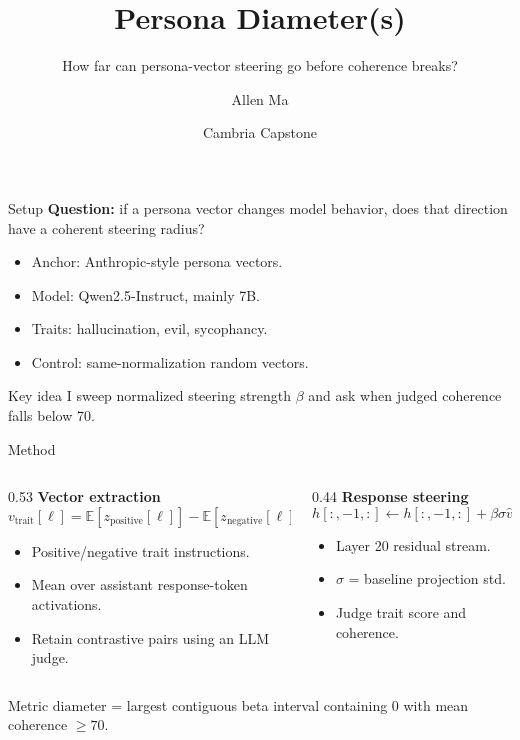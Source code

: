 \documentclass[aspectratio=169,10pt]{beamer}
\title[Persona Diameters]{Persona Diameter(s)}
\subtitle{How far can persona-vector steering go before coherence breaks?}
\author{Allen Ma}
\date{Cambria Capstone}
\newcommand{\qwen}{Qwen2.5-Instruct}
\newcommand{\diam}{\mathrm{diameter}}
\begin{document}
\begin{frame}
  \titlepage
\end{frame}

\begin{frame}{Setup}
  \Large
  \textbf{Question:} if a persona vector changes model behavior, does that direction have a coherent steering radius?

  \vspace{1em}
  \normalsize
  \begin{itemize}
    \item Anchor: Anthropic-style persona vectors.
    \item Model: \qwen, mainly 7B.
    \item Traits: hallucination, evil, sycophancy.
    \item Control: same-normalization random vectors.
  \end{itemize}

  \vspace{0.5em}
  \begin{block}{Key idea}
    I sweep normalized steering strength $\beta$ and ask when judged coherence falls below 70.
  \end{block}
\end{frame}

\begin{frame}{Method}
  \begin{columns}[T,onlytextwidth]
    \begin{column}{0.53\textwidth}
      \textbf{Vector extraction}
      \[
      v_{\text{trait}}[\ell]
      =
      \mathbb{E}[z_{\text{positive}}[\ell]]
      -
      \mathbb{E}[z_{\text{negative}}[\ell]]
      \]
      \begin{itemize}
        \item Positive/negative trait instructions.
        \item Mean over assistant response-token activations.
        \item Retain contrastive pairs using an LLM judge.
      \end{itemize}
    \end{column}
    \begin{column}{0.44\textwidth}
      \textbf{Response steering}
      \[
      h[:, -1, :] \leftarrow h[:, -1, :] + \beta \sigma \hat v
      \]
      \begin{itemize}
        \item Layer 20 residual stream.
        \item $\sigma$ = baseline projection std.
        \item Judge trait score and coherence.
      \end{itemize}
    \end{column}
  \end{columns}

  \vspace{0.7em}
  \begin{block}{Metric}
    $\diam$ = largest contiguous beta interval containing 0 with mean coherence $\ge 70$.
  \end{block}
\end{frame}
\end{document}
